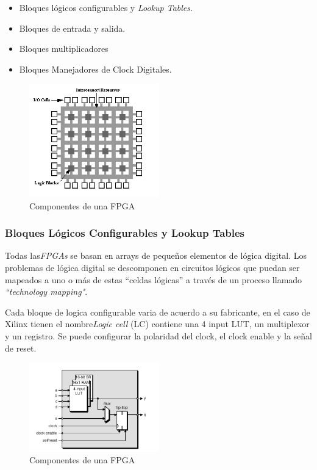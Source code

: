 \begin {itemize}
\item  Bloques lógicos configurables y \textit{Lookup Tables}.
\item  Bloques de entrada y salida.
\item  Bloques multiplicadores
\item  Bloques Manejadores de Clock Digitales.
 \end {itemize}

\begin{figure}[h!]
 \begin{center}
   \includegraphics[width=0.5\textwidth,keepaspectratio=true]{./images/fpga1a}
  \caption{Componentes de una FPGA}
  \label{fig:esquema}
 \end{center}
\end{figure}

		\subsubsection{Bloques Lógicos Configurables y Lookup Tables}

Todas las\textit{FPGAs} se basan en arrays de pequeños elementos de lógica digital. Los problemas de lógica digital se descomponen en circuitos lógicos que puedan ser mapeados a uno o más de estas “celdas lógicas” a través de un proceso llamado \textit{“technology mapping"}.

Cada bloque de logica configurable varia de acuerdo a su fabricante, en el caso de Xilinx tienen el nombre\textit{Logic cell} (LC) contiene una 4 input LUT, un multiplexor y un registro. Se puede configurar la polaridad del clock, el clock enable y la señal de reset.


\begin{figure}[h!]
 \begin{center}
 \includegraphics[width=0.5\textwidth,keepaspectratio=true]{./images/celda}
  \caption{Componentes de una FPGA}
  \label{fig:esquema}
 \end{center}
\end{figure}

